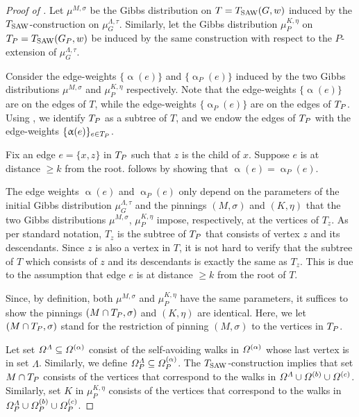 \documentclass[11pt,reqno]{amsart}
\numberwithin{equation}{section}
\newcommand{\blue}[1]{{\color{blue}#1}}
\newcommand{\bluepigment}[1]{{\color{blue(pigment)}#1}}
\newcommand{\cadmiumgreen}[1]{{\color{cadmiumgreen}#1}}
\newcommand{\goldenbrown}[1]{{\color{goldenbrown}#1}}
\newcommand{\heliotrope}[1]{{\color{heliotrope}#1}}
\newcommand{\Tsaw}{T_{\rm SAW}}
\renewcommand{\blue}[1]{#1}
\renewcommand{\bluepigment}[1]{#1}
\renewcommand{\cadmiumgreen}[1]{#1}
\renewcommand{\goldenbrown}[1]{#1}
\renewcommand{\heliotrope}[1]{#1}
\newcommand{\ke}{\blue{e}}
\newcommand{\kK}{\bluepigment{K}}
\newcommand{\kk}{\bluepigment{k}}
\newcommand{\kP}{\goldenbrown{P}}
\newcommand{\kw}{\blue{w}}
\newcommand{\kx}{\heliotrope{x}}
\newcommand{\kz}{\cadmiumgreen{z}}
\renewcommand{\ke}{e}
\renewcommand{\kK}{K}
\renewcommand{\kk}{k}
\renewcommand{\kP}{P}
\renewcommand{\kw}{w}
\renewcommand{\kx}{x}
\renewcommand{\kz}{z}
\newcommand{\infweight}{\upalpha}
\begin{document}
\begin{proof}[Proof of ]


Let $\mu^{M,\sigma}$ be the Gibbs distribution on $T=\Tsaw(G,\kw)$ induced by the $\Tsaw$-construction on 
$\mu^{\Lambda,\tau}_G$. Similarly, let the Gibbs distribution $\mu^{\kK,\eta}_P$ on $\XTPw=\Tsaw(\gext{G}{\kP},w)$ 
be induced by the same construction  with respect to the $\kP$-extension of $\mu^{\Lambda,\tau}_G$. 



Consider the edge-weights $\{ \infweight(\ke)\}$ and $\{ \infweight_{\kP}(\ke)\}$ induced by the two Gibbs distributions 
 $\mu^{M,\sigma}$ and $\mu^{\kK,\eta}_{\kP}$ respectively. Note that the edge-weights $\{ \infweight(\ke)\}$ are on
 the edges of $T$, while the edge-weights $\{ \infweight_{\kP}(\ke)\}$ are on the edges of $\XTPw$. 
% 
Using , we identify $\XTPw$ as a subtree of $T$,  and we endow the
edges of $\XTPw$ with the edge-weights $\{\infweight(\ke)\}_{\ke\in \XTPw}$. 


Fix an edge $\ke=\{\kx,\kz\}$ in $\XTPw$ such that $\kz$ is the child of $\kx$.  Suppose  $\ke$ is at distance $\geq \kk$ 
from the root.  follows by showing that $\infweight(\ke)=\infweight_{\kP}(\ke)$. 




The edge weights $\infweight(\ke)$ and $\infweight_{\kP}(\ke)$ only depend on the
parameters of the initial Gibbs distribution $\mu^{\Lambda,\tau}_G$ and the pinnings $(M,\sigma)$ and 
$(\kK,\eta)$ that the two Gibbs distributions $\mu^{M,\sigma}$, $\mu^{\kK,\eta}_{\kP}$ impose, respectively,
at the vertices of $T_{\kz}$.  As per standard notation, $T_{\kz}$ is the subtree of $\XTPw$ that consists 
of vertex $\kz$ and its descendants. Since $\kz$  is also a vertex in $T$, it is not hard to verify that 
the subtree of $T$ which consists of $\kz$ and its  descendants is exactly the same as $T_{\kz}$.
This is due to the assumption that edge $\ke$ is at distance $\geq k$ from the root of $T$. 
 
 
 
Since, by definition, both $\mu^{M,\sigma}$ and $\mu^{\kK,\eta}_{\kP}$ have the same parameters,
it suffices to show  the pinnings $(M\cap \XTPw,\sigma)$ and 
$(\kK,\eta)$ are identical. Here,  we let $(M\cap \XTPw,\sigma)$ stand for the restriction of pinning 
$(M,\sigma)$ to the vertices in $\XTPw$.



Let set $\Omega^{\Lambda}\subseteq \Omega^{(\alpha)}$ consist of the self-avoiding walks in  $\Omega^{(\alpha)}$ 
whose last vertex is  in set $\Lambda$. Similarly, we define $\sawpaths^{\Lambda}_{\kP} \subseteq \sawpaths^{(\alpha)}_{\kP}$. 
The $\Tsaw$-construction implies that set $M\cap \XTPw$ consists of the vertices that  correspond to the walks in 
$ \Omega^{\Lambda} \cup \Omega^{(b)}\cup \Omega^{(c)}$. Similarly, set $\kK$ in $\mu^{K,\eta}_{\kP}$ consists of the 
vertices that correspond to the walks in   $ \sawpaths^{\Lambda}_{\kP}\cup \sawpaths^{(b)}_{\kP}\cup \sawpaths^{(c)}_{\kP}$.







\end{proof}
\end{document}
